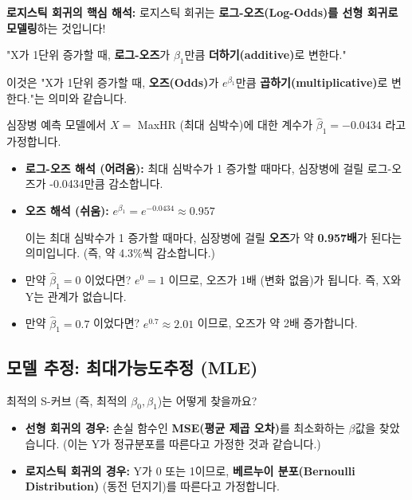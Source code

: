 \documentclass[11pt,a4paper]{book}
\theoremstyle{definition}
\begin{document}
\begin{summarybox}
\textbf{로지스틱 회귀의 핵심 해석:}
로지스틱 회귀는 \textbf{로그-오즈(Log-Odds)를 선형 회귀로 모델링}하는 것입니다!

"X가 1단위 증가할 때, \textbf{로그-오즈}가 $\beta_1$만큼 \textbf{더하기(additive)}로 변한다."

이것은 "X가 1단위 증가할 때, \textbf{오즈(Odds)}가 $e^{\beta_1}$만큼 \textbf{곱하기(multiplicative)}로 변한다."는 의미와 같습니다.
\end{summarybox}

\begin{examplebox}[title= $\beta_1$ 값 해석하기]
    심장병 예측 모델에서 $X=$ MaxHR (최대 심박수)에 대한 계수가 $\hat{\beta}_1 = -0.0434$ 라고 가정합니다.

    \begin{itemize}
        \item \textbf{로그-오즈 해석 (어려움):}
        최대 심박수가 1 증가할 때마다, 심장병에 걸릴 로그-오즈가 -0.0434만큼 감소합니다.
        
        \item \textbf{오즈 해석 (쉬움):}
        $e^{\beta_1} = e^{-0.0434} \approx 0.957$
        
        이는 최대 심박수가 1 증가할 때마다, 심장병에 걸릴 \textbf{오즈}가 약 \textbf{0.957배}가 된다는 의미입니다. (즉, 약 4.3\%씩 감소합니다.)
        
        \item 만약 $\hat{\beta}_1 = 0$ 이었다면? $e^0 = 1$ 이므로, 오즈가 1배 (변화 없음)가 됩니다. 즉, X와 Y는 관계가 없습니다.
        \item 만약 $\hat{\beta}_1 = 0.7$ 이었다면? $e^{0.7} \approx 2.01$ 이므로, 오즈가 약 2배 증가합니다.
    \end{itemize}
\end{examplebox}

\subsection{모델 추정: 최대가능도추정 (MLE)}

최적의 S-커브 (즉, 최적의 $\beta_0, \beta_1$)는 어떻게 찾을까요?

\begin{itemize}
    \item \textbf{선형 회귀의 경우:} 손실 함수인 \textbf{MSE(평균 제곱 오차)}를 최소화하는 $\beta$값을 찾았습니다. (이는 Y가 정규분포를 따른다고 가정한 것과 같습니다.)
    \item \textbf{로지스틱 회귀의 경우:} Y가 0 또는 1이므로, \textbf{베르누이 분포(Bernoulli Distribution)} (동전 던지기)를 따른다고 가정합니다.
\end{itemize}
\end{document}
